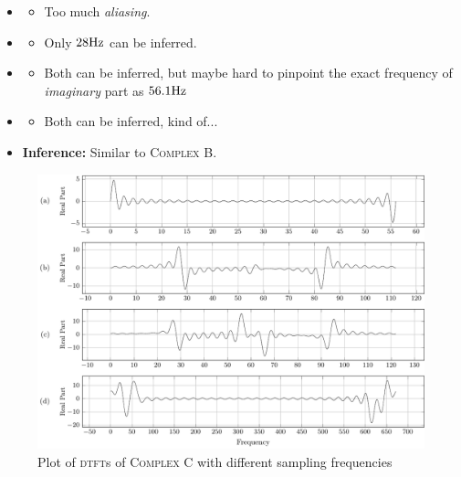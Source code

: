 \documentclass[../../course]{subfiles}
\begin{document}
\begin{itemize} [label=]

    \item \sampFreqMuchLess
        \begin{itemize} [label=]
            \item Too much \emph{aliasing}.
        \end{itemize}

    \item \sampFreqNorm
        \begin{itemize} [label=]
            \item Only $\freqXOne \si{Hz}$ can be inferred.
        \end{itemize}

    \item \sampFreqSligGreat
        \begin{itemize} [label=]
            \item Both can be inferred, but maybe hard to pinpoint the exact frequency of \emph{imaginary}
                part as $\freqXThree \si{Hz}$
        \end{itemize}

    \item \sampFreqMuchGreat
        \begin{itemize} [label=]
            \item Both can be inferred, kind of...
        \end{itemize}

    \item \textbf{Inference:} Similar to \textsc{Complex B}.

\end{itemize}

\vfill

\begin{figure} [H]
    \centering
     {
        \includegraphics[height = 0.8\textheight] {tikzpics/plotDtftComplexC32.pdf}
    }
     {Plot of \textsc{dtft}s of \textsc{Complex C} with different sampling frequencies}
    \label{plt:dtftCplxC32}
\end{figure}
\end{document}
